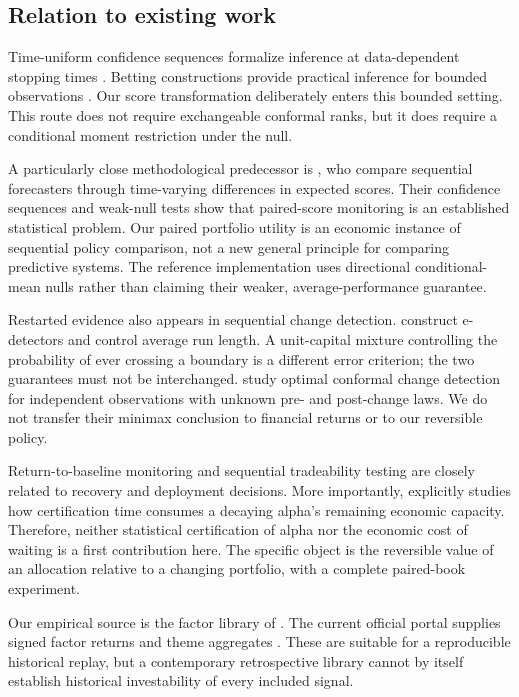 \subsection{Relation to existing work}
Time-uniform confidence sequences formalize inference at data-dependent stopping times \citep{howard2021}. Betting constructions provide practical inference for bounded observations \citep{waudby2024}. Our score transformation deliberately enters this bounded setting. This route does not require exchangeable conformal ranks, but it does require a conditional moment restriction under the null.

A particularly close methodological predecessor is \citet{choe2024}, who compare sequential forecasters through time-varying differences in expected scores. Their confidence sequences and weak-null tests show that paired-score monitoring is an established statistical problem. Our paired portfolio utility is an economic instance of sequential policy comparison, not a new general principle for comparing predictive systems. The reference implementation uses directional conditional-mean nulls rather than claiming their weaker, average-performance guarantee.

Restarted evidence also appears in sequential change detection. \citet{shin2022} construct e-detectors and control average run length. A unit-capital mixture controlling the probability of ever crossing a boundary is a different error criterion; the two guarantees must not be interchanged. \citet{bhattacharyya2026} study optimal conformal change detection for independent observations with unknown pre- and post-change laws. We do not transfer their minimax conclusion to financial returns or to our reversible policy.

Return-to-baseline monitoring \citep{regis2026} and sequential tradeability testing \citep{stephan2026} are closely related to recovery and deployment decisions. More importantly, \citet{bonacorsi2026} explicitly studies how certification time consumes a decaying alpha's remaining economic capacity. Therefore, neither statistical certification of alpha nor the economic cost of waiting is a first contribution here. The specific object is the reversible value of an allocation relative to a changing portfolio, with a complete paired-book experiment.

Our empirical source is the factor library of \citet{jkp2023}. The current official portal supplies signed factor returns and theme aggregates \citep{jkpdata}. These are suitable for a reproducible historical replay, but a contemporary retrospective library cannot by itself establish historical investability of every included signal.

